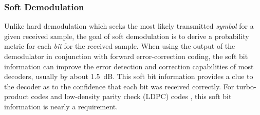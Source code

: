\subsubsection{Soft Demodulation}
\label{module:modem:digital:soft}
Unlike hard demodulation which seeks the most likely transmitted
{\em symbol} for a given received sample,
the goal of soft demodulation is to derive a probability metric for each
{\em bit} for the received sample.
When using the output of the demodulator in conjunction with forward
error-correction coding, the soft bit information can improve the error
detection and correction capabilities of most decoders,
usually by about 1.5~dB.
This soft bit information provides a clue to the decoder as to the
confidence that each bit was received correctly.
For turbo-product codes \cite{Berrou:1993} and
low-density parity check (LDPC) codes \cite{Gallager:1962},
this soft bit information is nearly a requirement.

